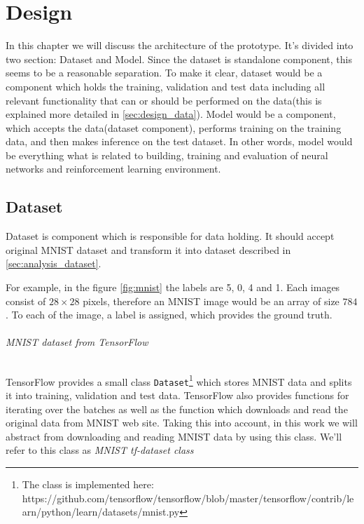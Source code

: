 \chapter{Design}
In this chapter we will discuss the architecture of the prototype.
It's divided into two section: Dataset and Model. Since
the dataset is standalone component, this seems to be
a reasonable separation. To make it clear, dataset would be a component
which holds the training, validation and test data including all relevant
functionality that can or should be performed on the
data(this is explained more detailed in \autoref{sec:design_data}).
Model would be a component, which accepts the data(dataset component), performs
training on the training data, and then makes inference on the test dataset.
In other words, model would be everything what is related to building,
training and evaluation of neural networks and reinforcement learning environment.



\section{Dataset}
\label{sec:design_data}

Dataset is component which is responsible for data holding. It should
accept original MNIST dataset and transform it into dataset described
in \autoref{sec:analysis_dataset}.

For example, in the figure \ref{fig:mnist} the labels are 5, 0, 4 and 1.
Each images consist of $28\times28$ pixels, therefore an MNIST image would
be an array of size $784$. To each of the image, a label is assigned,
which provides the ground truth.

\subparagraph{MNIST dataset from TensorFlow}

TensorFlow provides a small class \lstinline{Dataset}\footnote{
The class is implemented here: https://github.com/tensorflow/tensorflow/blob/master/tensorflow/contrib/learn/python/learn/datasets/mnist.py
} which stores MNIST data and splits it into training,
validation and test data. TensorFlow also provides functions for iterating
over the batches as well as the function which downloads and read
the original data
from MNIST web site. Taking this into account, in this work we will abstract from
downloading and reading MNIST data by using this class. We'll refer
to this class as \emph{MNIST tf-dataset class}


